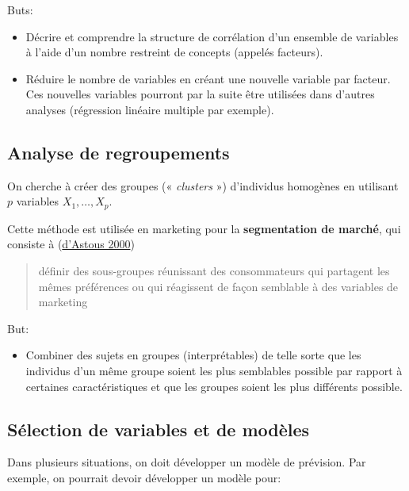 \documentclass[
  11pt,
  letterpaper,
]{scrbook}
\providecommand{\tightlist}{%
  \setlength{\itemsep}{0pt}\setlength{\parskip}{0pt}}\usepackage{longtable,booktabs,array}
\theoremstyle{definition}
\theoremstyle{remark}
\begin{document}
Buts:

\begin{itemize}
\tightlist
\item
  Décrire et comprendre la structure de corrélation d'un ensemble de
  variables à l'aide d'un nombre restreint de concepts (appelés
  facteurs).
\item
  Réduire le nombre de variables en créant une nouvelle variable par
  facteur. Ces nouvelles variables pourront par la suite être utilisées
  dans d'autres analyses (régression linéaire multiple par exemple).
\end{itemize}

\hypertarget{analyse-de-regroupements}{%
\subsection{Analyse de regroupements}\label{analyse-de-regroupements}}

On cherche à créer des groupes (« \emph{clusters} ») d'individus
homogènes en utilisant \(p\) variables \(X_1, \ldots, X_p\).

Cette méthode est utilisée en marketing pour la \textbf{segmentation de
marché}, qui consiste à (\protect\hyperlink{ref-dAstous:2000}{d'Astous
2000})

\begin{quote}
définir des sous-groupes réunissant des consommateurs qui partagent les
mêmes préférences ou qui réagissent de façon semblable à des variables
de marketing
\end{quote}

But:

\begin{itemize}
\tightlist
\item
  Combiner des sujets en groupes (interprétables) de telle sorte que les
  individus d'un même groupe soient les plus semblables possible par
  rapport à certaines caractéristiques et que les groupes soient les
  plus différents possible.
\end{itemize}

\hypertarget{suxe9lection-de-variables-et-de-moduxe8les}{%
\subsection{Sélection de variables et de
modèles}\label{suxe9lection-de-variables-et-de-moduxe8les}}

Dans plusieurs situations, on doit développer un modèle de prévision.
Par exemple, on pourrait devoir développer un modèle pour:
\end{document}
